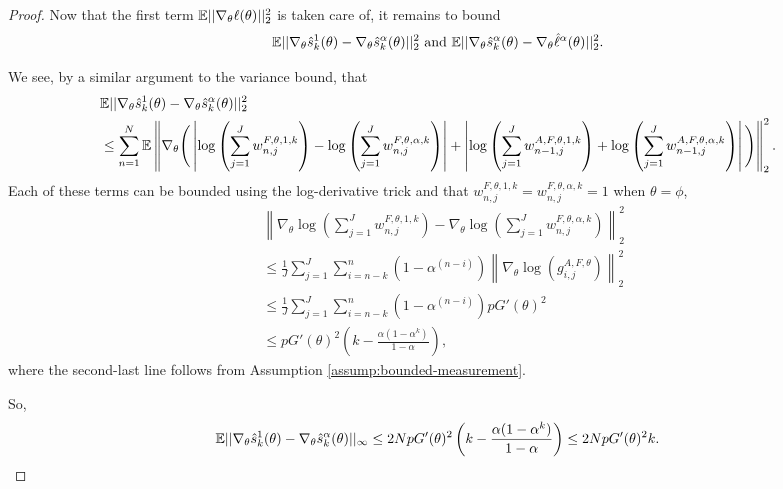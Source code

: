 \begin{proof}
Now that the first term $\mathbb{E}||\nabla_\theta\ell(\theta)||_2^2$ is taken care of, it remains to bound $$\mathbb{E}||\nabla_\theta\hat s_k^1(\theta) - \nabla_\theta\hat s_k^\alpha(\theta)||_2^2 \text{ and } \mathbb{E}||\nabla_\theta\hat s_k^\alpha(\theta) -  \nabla_\theta\hat\ell^\alpha(\theta)||_2^2.$$


We see, by a similar argument to the variance bound, that
\begin{align}
    &\mathbb{E}||\nabla_\theta\hat s_k^1(\theta) - \nabla_\theta\hat s_k^\alpha(\theta)||_2^2\\
    &\leq \sum_{n=1}^N \mathbb{E}\left\lVert\nabla_\theta \Bigg(\left|\log\left(\sum_{j=1}^Jw_{n,j}^{F,\theta,1,k}\right)- \log\left(\sum_{j=1}^Jw_{n,j}^{F,\theta,\alpha,k}\right)\right|
    +\left|\log\left(\sum_{j=1}^Jw_{n-1,j}^{A, F,\theta,1,k}\right) + \log\left(\sum_{j=1}^Jw_{n-1,j}^{A, F,\theta,\alpha,k}\right)\right|\Bigg)\right\rVert_2^2.
\end{align}
Each of these terms can be bounded using the log-derivative trick and that $w_{n,j}^{F,\theta,1,k} = w_{n,j}^{F,\theta,\alpha,k} = 1$ when $\theta=\phi$,
\begin{align}
    &\left\lVert\nabla_\theta\log\left(\sum_{j=1}^J w_{n,j}^{F,\theta,1,k}\right)-\nabla_\theta\log\left(\sum_{j=1}^J w_{n,j}^{F,\theta,\alpha,k}\right)\right\rVert_{2}^2\\
    &\leq \frac{1}{J}\sum_{j=1}^J \sum_{i=n-k}^{n}(1-\alpha^{(n-i)})\left\lVert\nabla_\theta\log\left(g_{i,j}^{A,F,\theta} \right)\right\rVert_2^2\\
    &\leq \frac{1}{J}\sum_{j=1}^J \sum_{i=n-k}^{n}(1-\alpha^{(n-i)})pG'(\theta)^2\\
    &\leq pG'(\theta)^2\left(k-\frac{\alpha(1-\alpha^k)}{1-\alpha}\right),
\end{align}
where the second-last line follows from Assumption \ref{assump:bounded-measurement}.

So, 
\begin{align}
    \mathbb{E}||\nabla_\theta\hat s_k^1(\theta) - \nabla_\theta\hat s_k^\alpha(\theta)||_\infty
    \leq 2NpG'(\theta)^2\left(k-\frac{\alpha(1-\alpha^k)}{1-\alpha}\right) 
    \leq 2NpG'(\theta)^2k.
\end{align}



\end{proof}
